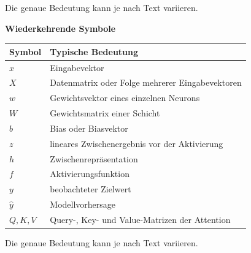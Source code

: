 Die genaue Bedeutung kann je nach Text variieren.
\begin{frame}[t]
\par\medskip\noindent\textbf{Wiederkehrende Symbole}\par


\par\addvspace{\medskipamount}
\noindent\begin{tabularx}{\linewidth}{@{}>{\raggedright\arraybackslash}p{}>{\raggedright\arraybackslash}X@{}}
\toprule
Symbol & Typische Bedeutung \\
\midrule
$x$ & Eingabevektor \\
$X$ & Datenmatrix oder Folge mehrerer Eingabevektoren \\
$w$ & Gewichtsvektor eines einzelnen Neurons \\
$W$ & Gewichtsmatrix einer Schicht \\
$b$ & Bias oder Biasvektor \\
$z$ & lineares Zwischenergebnis vor der Aktivierung \\
$h$ & Zwischenrepräsentation \\
$f$ & Aktivierungsfunktion \\
$y$ & beobachteter Zielwert \\
$\hat{y}$ & Modellvorhersage \\
$Q,K,V$ & Query-, Key- und Value-Matrizen der Attention \\
\bottomrule
\end{tabularx}
\par\addvspace{\medskipamount}

Die genaue Bedeutung kann je nach Text variieren.
\end{frame}

